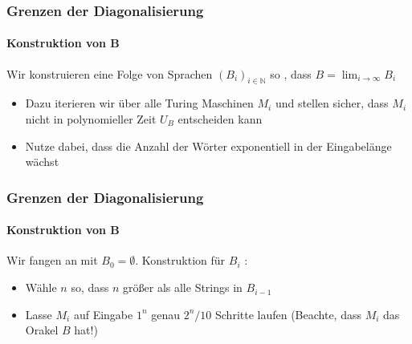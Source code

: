 \begin{frame}
	\frametitle{Grenzen der Diagonalisierung}
	\framesubtitle{Konstruktion von B}
	Wir konstruieren eine Folge von Sprachen $(B_i)_{i \in \mathbb{N}}$ so , dass 
	$B = \lim_{i \to \infty} B_i$	
	\begin{itemize}[<+->]
	\item Dazu iterieren wir \"uber alle Turing Maschinen $M_i$ und stellen
	sicher, dass $M_i$ nicht in polynomieller Zeit $U_B$ entscheiden kann
	\item Nutze dabei, dass die Anzahl der Wörter exponentiell in der Eingabelänge wächst
	\end{itemize}
\end{frame}
\begin{frame}
	\frametitle{Grenzen der Diagonalisierung}
	\framesubtitle{Konstruktion von B}
	Wir fangen an mit $B_0 = \emptyset$. Konstruktion f\"ur $B_i$ :
	\begin{itemize}[<+->]
		\item Wähle $n$ so, dass $n$ größer als alle Strings in $B_{i-1}$
		\item Lasse $M_i$ auf Eingabe $1^n$ genau $2^n / 10$ Schritte laufen \newline
			(Beachte, dass $M_i$ das Orakel $B$ hat!)
	\end{itemize}
\end{frame}
